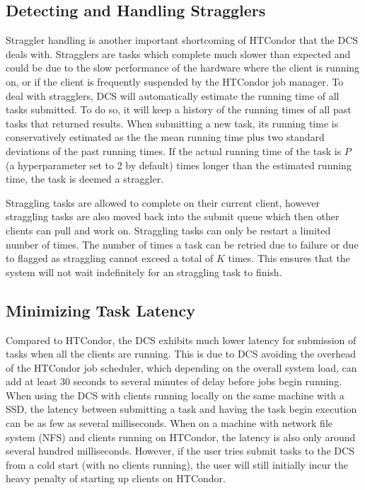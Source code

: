 \documentclass{article}
\begin{document}
\subsection{Detecting and Handling Stragglers}

Straggler handling is another important shortcoming of HTCondor that the DCS deals with. Stragglers are tasks which complete much slower than expected and could be due to the slow performance of the hardware where the client is running on, or if the client is frequently suspended by the HTCondor job manager. To deal with stragglers, DCS will automatically estimate the running time of all tasks submitted. To do so, it will keep a history of the running times of all past tasks that returned results. When submitting a new task, its running time is conservatively estimated as the the mean running time plus two standard deviations of the past running times. If the actual running time of the task is $P$ (a hyperparameter set to 2 by default) times longer than the estimated running time, the task is deemed a straggler.

Straggling tasks are allowed to complete on their current client, however straggling tasks are also moved back into the submit queue which then other clients can pull and work on. Straggling tasks can only be restart a limited number of times. The number of times a task can be retried due to failure or due to flagged as straggling cannot exceed a total of $K$ times. This ensures that the system will not wait indefinitely for an straggling task to finish.

\subsection{Minimizing Task Latency}

Compared to HTCondor, the DCS exhibits much lower latency for submission of tasks when all the clients are running. This is due to DCS avoiding the overhead of the HTCondor job scheduler, which depending on the overall system load, can add at least 30 seconds to several minutes of delay before jobs begin running. When using the DCS with clients running locally on the same machine with a SSD, the latency between submitting a task and having the task begin execution can be as few as several milliseconds. When on a machine with network file system (NFS) \cite{sandberg1985design} and clients running on HTCondor, the latency is also only around several hundred milliseconds. However, if the user tries submit tasks to the DCS from a cold start (with no clients running), the user will still initially incur the heavy penalty of starting up clients on HTCondor.
\end{document}
